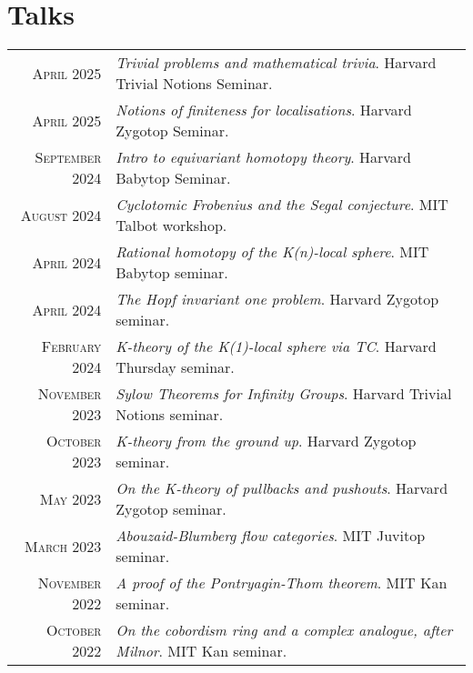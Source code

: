 \documentclass[a4paper,11pt]{article} %
\begin{document}

\section{Talks}

\begin{tabular}{rl}

\textsc{April} 2025 & \emph{Trivial problems and mathematical trivia}. Harvard Trivial Notions Seminar.\\

\textsc{April} 2025 & \emph{Notions of finiteness for localisations}. Harvard Zygotop Seminar.\\

\textsc{September} 2024 & \emph{Intro to equivariant homotopy theory}. Harvard Babytop Seminar.\\

\textsc{August} 2024 & \emph{Cyclotomic Frobenius and the Segal conjecture}. MIT Talbot workshop.\\

\textsc{April} 2024 & \emph{Rational homotopy of the K(n)-local sphere}. MIT Babytop seminar.\\

\textsc{April} 2024 & \emph{The Hopf invariant one problem}. Harvard Zygotop seminar.\\

\textsc{February} 2024 & \emph{K-theory of the K(1)-local sphere via TC}. Harvard Thursday seminar.\\

\textsc{November} 2023 & \emph{Sylow Theorems for Infinity Groups}. Harvard Trivial Notions seminar.\\

\textsc{October} 2023 & \emph{K-theory from the ground up}. Harvard Zygotop seminar.\\

\textsc{May} 2023 & \emph{On the K-theory of pullbacks and pushouts}. Harvard Zygotop seminar.\\

\textsc{March} 2023 & \emph{Abouzaid-Blumberg flow categories}. MIT Juvitop seminar.\\

\textsc{November} 2022 & \emph{A proof of the Pontryagin-Thom theorem}. MIT Kan seminar.\\

\textsc{October} 2022 & \emph{On the cobordism ring and a complex analogue, after Milnor}. MIT Kan seminar.

\end{tabular}
\end{document}
